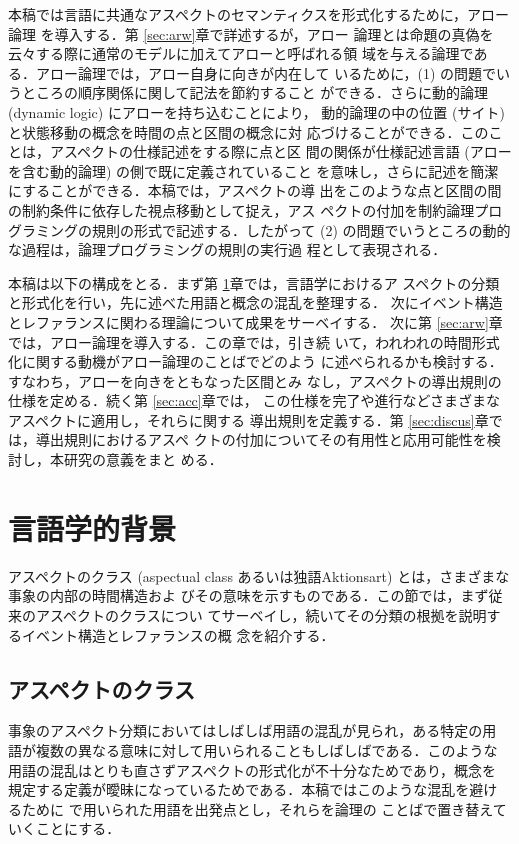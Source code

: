 本稿では言語に共通なアスペクトのセマンティクスを形式化するために，アロー
論理 \cite{Benthem94} を導入する．第 \ref{sec:arw}章で詳述するが，アロー
論理とは命題の真偽を云々する際に通常のモデルに加えてアローと呼ばれる領
域を与える論理である．アロー論理では，アロー自身に向きが内在して
いるために，(1) の問題でいうところの順序関係に関して記法を節約すること
ができる．さらに動的論理 (dynamic logic) にアローを持ち込むことにより，
動的論理の中の位置 (サイト) と状態移動の概念を時間の点と区間の概念に対
応づけることができる．このことは，アスペクトの仕様記述をする際に点と区
間の関係が仕様記述言語 (アローを含む動的論理) の側で既に定義されていること
を意味し，さらに記述を簡潔にすることができる．本稿では，アスペクトの導
出をこのような点と区間の間の制約条件に依存した視点移動として捉え，アス
ペクトの付加を制約論理プログラミングの規則の形式で記述する．したがって 
(2) の問題でいうところの動的な過程は，論理プログラミングの規則の実行過
程として表現される．

本稿は以下の構成をとる．まず第 \ref{sec:akt}章では，言語学におけるア
スペクトの分類と形式化を行い，先に述べた用語と概念の混乱を整理する．
次にイベント構造とレファランスに関わる理論について成果をサーベイする．
次に第 \ref{sec:arw}章では，アロー論理を導入する．この章では，引き続
いて，われわれの時間形式化に関する動機がアロー論理のことばでどのよう
に述べられるかも検討する．すなわち，アローを向きをともなった区間とみ
なし，アスペクトの導出規則の仕様を定める．続く第 \ref{sec:acc}章では，
この仕様を完了や進行などさまざまなアスペクトに適用し，それらに関する
導出規則を定義する．第 \ref{sec:discus}章では，導出規則におけるアスペ
クトの付加についてその有用性と応用可能性を検討し，本研究の意義をまと
める．

\section{言語学的背景}\label{sec:akt}
アスペクトのクラス (aspectual class あるいは独語Aktionsart)
とは，さまざまな事象の内部の時間構造およ
びその意味を示すものである．この節では，まず従来のアスペクトのクラスについ
てサーベイし，続いてその分類の根拠を説明するイベント構造とレファランスの概
念を紹介する．

\subsection{アスペクトのクラス}
事象のアスペクト分類においてはしばしば用語の混乱が見られ，ある特定の用
語が複数の異なる意味に対して用いられることもしばしばである．このような
用語の混乱はとりも直さずアスペクトの形式化が不十分なためであり，概念を
規定する定義が曖昧になっているためである．本稿ではこのような混乱を避け
るために \cite{Comrie76} で用いられた用語を出発点とし，それらを論理の
ことばで置き替えていくことにする．

